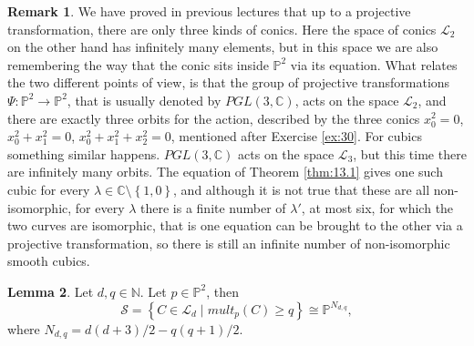 \documentclass{article}
\newcommand{\N}{\mathbb{N}}
\newcommand{\C}{\mathbb{C}}
\renewcommand{\P}{\mathbb{P}}
\newcommand{\rb}[1]{\left( #1 \right)}
\newcommand{\cb}[1]{\left\{ #1 \right\}}
\theoremstyle{definition}\newtheorem{definition}{Definition}[section]
\theoremstyle{definition}\newtheorem{notation}[definition]{Notation}
\theoremstyle{definition}\newtheorem{remark}[definition]{Remark}
\theoremstyle{definition}\newtheorem{example}[definition]{Example}
\theoremstyle{definition}\newtheorem{fact}{Fact}
\theoremstyle{definition}\newtheorem{exercise}{Exercise}
\newtheorem{lemma}[definition]{Lemma}
\begin{document}
\begin{remark}
We have proved in previous lectures that up to a projective transformation, there are only three kinds of conics. Here the space of conics $ \mathcal{L}_2 $ on the other hand has infinitely many elements, but in this space we are also remembering the way that the conic sits inside $ \P^2 $ via its equation. What relates the two different points of view, is that the group of projective transformations $ \Psi : \P^2 \to \P^2 $, that is usually denoted by $ PGL\rb{3, \C} $, acts on the space $ \mathcal{L}_2 $, and there are exactly three orbits for the action, described by the three conics $ x_0^2 = 0 $, $ x_0^2 + x_1^2 = 0 $, $ x_0^2 + x_1^2 + x_2^2 = 0 $, mentioned after Exercise \ref{ex:30}. For cubics something similar happens. $ PGL\rb{3, \C} $ acts on the space $ \mathcal{L}_3 $, but this time there are infinitely many orbits. The equation of Theorem \ref{thm:13.1} gives one such cubic for every $ \lambda \in \C \setminus \cb{1, 0} $, and although it is not true that these are all non-isomorphic, for every $ \lambda $ there is a finite number of $ \lambda' $, at most six, for which the two curves are isomorphic, that is one equation can be brought to the other via a projective transformation, so there is still an infinite number of non-isomorphic smooth cubics.
\end{remark}

\begin{lemma}
\label{lem:14.5}
Let $ d, q \in \N $. Let $ p \in \P^2 $, then
$$ \mathcal{S} = \cb{C \in \mathcal{L}_d \mid mult_p\rb{C} \ge q} \cong \P^{N_{d, q}}, $$
where $ N_{d, q} = d\rb{d + 3} / 2 - q\rb{q + 1} / 2. $
\end{lemma}
\end{document}
